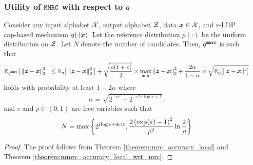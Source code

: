 \subsubsection{Utility of \texorpdfstring{$\texttt{MMRC}$}{MMRC} with respect to \texorpdfstring{$q$}{q}}\label{appendix:utility_mmrc_q}

\begin{theorem}\label{theorem:mmrc_accuracy_local}
Consider any input alphabet $\mathcal{X}$, output alphabet $\mathcal{Z}$, data ${\boldsymbol{x}} \in \mathcal{X}$, and $\varepsilon$-LDP cap-based mechanism $q(\cdot|{\boldsymbol{x}})$.
Let the reference distribution $p(\cdot)$ be the uniform distribution on $\mathcal{Z}$.
Let $N$ denote the number of candidates. Then, $q^{\texttt{mmrc}}$ is such that 
\begin{align}
    \mathbb{E}_{q^{\texttt{mmrc}}} \big[ \left\lVert  {\boldsymbol{z}} - {\boldsymbol{x}} \right\rVert^2_2  \big]  \leq \mathbb{E}_{q} \big[ \left\lVert  {\boldsymbol{z}} - {\boldsymbol{x}} \right\rVert^2_2  \big]  + \sqrt{\frac{\rho (1+\varepsilon)}{2}} \times \max_{{\boldsymbol{x}}, {\boldsymbol{z}}} \left\lVert  {\boldsymbol{z}} - {\boldsymbol{x}} \right\rVert^2_2  + \frac{2\alpha }{1-\alpha} \times \sqrt{\mathbb{E}_{q}[\|{\boldsymbol{z}} - {\boldsymbol{x}}\|^4]}
\end{align}
holds with probability at least $1 - 2\alpha$ where
\begin{align}
\alpha = \sqrt{2^{-c\varepsilon} + 2^{-c^2/\log e + 1}}.
\end{align}
and $c$ and $\rho \in (0,1)$ are free variables such that
\begin{align}
    N = \max\bigg\{ 2^{(\log e + 4c) \varepsilon}, \frac{2\left(\exp(\varepsilon)-1\right)^2 }{\rho^2}  \ln\frac{2}{\rho} \bigg\}
\end{align}
\end{theorem}
\begin{proof}
The proof follows from Theorem \ref{theorem:mrc_accuracy_local} and Theorem \ref{theorem:mmrc_accuracy_local_wrt_mrc}.
\end{proof}
